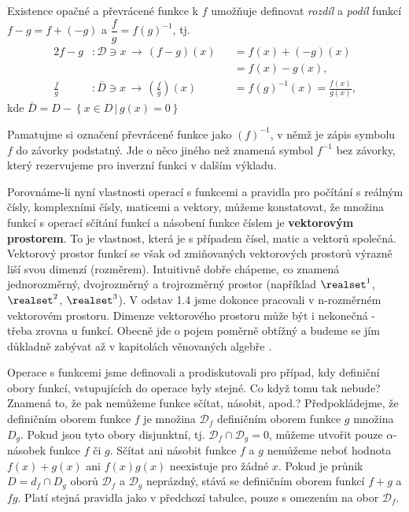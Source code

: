       Existence opačné a převrácené funkce k \(f\) umožňuje definovat \emph{rozdíl} a \emph{podíl} 
      funkcí \(f-g=f+(-g)\) a \(\dfrac{f}{g}=f(g)^{-1}\), tj.
      \begin{alignat*}{2}
        f-g         &: \mathcal{D}\ni x\,\rightarrow\, (f-g)(x)&&=f(x)+(-g)(x) \\
                    &                                          &&=f(x)-g(x),  \\
        \frac{f}{g} &: \bar{D}\ni x\,\rightarrow\, 
                                   \left(\frac{f}{g}\right)(x) &&= f(g)^{-1}(x) = \frac{f(x)}{g(x)}, 
      \end{alignat*}
      kde \(\bar{D}=D-\left\{x\in D\,\lvert\,g(x)=0 \right\}\) 
      
      \begin{tcnote}
        Pamatujme si označení převrácené funkce jako \((f)^{-1}\), v němž je zápis symbolu \(f\) do
        závorky podstatný. Jde o něco jiného než znamená symbol \(f^{-1}\) bez závorky, který
        rezervujeme pro inverzní funkci v dalším výkladu.
      \end{tcnote}

      \begin{tcnote}
        Porovnáme-li nyní vlastnosti operací s funkcemi a pravidla pro počítání s reálným čísly,
        komplexními čísly, maticemi a vektory, můžeme konstatovat, že množina funkcí s operací
        sčítání funkcí a násobení funkce číslem je \textbf{vektorovým prostorem}. To je vlastnost,
        která je s případem čísel, matic a vektorů společná. Vektorový prostor funkcí se však od
        zmiňovaných vektorových prostorů výrazně liší svou dimenzí (rozměrem). Intuitivně dobře
        chápeme, co znamená jednorozměrný, dvojrozměrný a trojrozměrný prostor (například
        \(\realset^1\), \(\realset^2\), \(\realset^3\)). V odstav 1.4 jsme dokonce pracovali v
        n-rozměrném vektorovém prostoru. Dimenze vektorového prostoru může být i nekonečná - třeba
        zrovna u funkcí. Obecně jde o pojem poměrně obtížný a budeme se jím důkladně zabývat až v
        kapitolách věnovaných algebře \cite[s.~58]{Musilova2009MA1}.
      \end{tcnote}
      
      Operace s funkcemi jsme definovali a prodiskutovali pro případ, kdy definiční obory funkcí, 
      vstupujících do operace byly stejné. Co když tomu tak nebude? Znamená to, že pak nemůžeme 
      funkce sčítat, násobit, apod.? Předpokládejme, že definičním oborem funkce \(f\) je množina 
      \(\mathcal{D}_f\) definičním oborem funkce \(g\) množina \(D_g\). Pokud jsou tyto obory 
      disjunktní, tj. \(\mathcal{D}_f \cap \mathcal{D}_g = 0\), můžeme utvořit pouze 
      \(\alpha\)-násobek funkce \(f\) či \(g\). Sčítat ani násobit funkce \(f\) a \(g\) nemůžeme 
      neboť hodnota \(f(x) + g(x)\) ani \(f(x)g(x)\) neexistuje pro žádné \(x\). Pokud je průnik 
      \(D=d_f\cap D_g\) oborů \(\mathcal{D}_f\) a \(\mathcal{D}_g\) neprázdný, stává se definičním 
      oborem funkcí \(f+g\) a \(fg\). Platí stejná pravidla jako v předchozí tabulce, pouze s 
      omezením na obor \(\mathcal{D}_f\).
    
